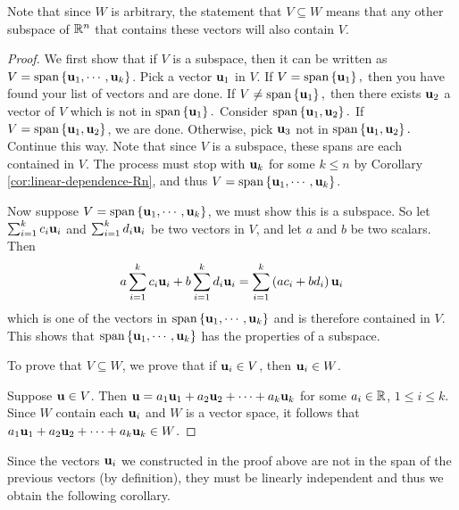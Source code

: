 Note that since $W$ is arbitrary, the statement that $V \subseteq W$ means that any other subspace of $\mathbb{R}^n$ that contains these vectors will also contain $V$. 

\begin{proof}
We first show that if $V$ is a subspace, then it can be written as $V= \mbox{\rm span}\left\{\mbox{\bf u}_{1},\cdots ,\mbox{\bf u}_{k}\right\}$. Pick a vector $\mbox{\bf u}_{1}$ in $V$. If $V=
\mbox{\rm span}\left\{\mbox{\bf u}_{1}\right\} ,$ then you have found your
list of vectors and are done. If $V\neq \mbox{\rm span}\left\{\mbox{\bf u}_{1}\right\} ,$ then
there exists $\mbox{\bf u}_{2}$ a vector of $V$ which is not in $
\mbox{\rm span}\left\{\mbox{\bf u}_{1}\right\} .$ Consider $\mbox{\rm span}\left\{
\mbox{\bf u}_{1},\mbox{\bf u}_{2}\right\}.$ 
If $V=\mbox{\rm span}\left\{\mbox{\bf u}_{1},\mbox{\bf u}_{2}\right\}$, we are
done. Otherwise, pick $\mbox{\bf u}_{3}$ not in $\mbox{\rm span}\left\{\mbox{\bf u}_{1},\mbox{\bf u}_{2}\right\} .$ Continue this way.
Note that since $V $ is a subspace, these spans are each contained in
$V$.  The process must stop with $\mbox{\bf u}_{k}$ for some $k\leq n$
by Corollary \ref{cor:linear-dependence-Rn}, and thus $V=\mbox{\rm span}\left\{\mbox{\bf u}_{1},\cdots ,
\mbox{\bf u}_{k}\right\}$.

Now suppose $V=\mbox{\rm span}\left\{\mbox{\bf u}_{1},\cdots ,
\mbox{\bf u}_{k}\right\}$, we must show this is a subspace. So let $\sum_{i=1}^{k}c_{i}\mbox{\bf u}_{i}$ and $
\sum_{i=1}^{k}d_{i}\mbox{\bf u}_{i}$ be two vectors in $V$, and let $a$
and $b$ be two scalars. Then 
\begin{equation*}
a \sum_{i=1}^{k}c_{i}\mbox{\bf u}_{i}+ b \sum_{i=1}^{k}d_{i}\mbox{\bf u}_{i}=
 \sum_{i=1}^{k}\left(a c_{i}+b  d_{i}\right) \mbox{\bf u}_{i}
\end{equation*}
which is one of the vectors in $\mbox{\rm span}\left\{\mbox{\bf u}_{1},\cdots ,
\mbox{\bf u}_{k}\right\}$ and is therefore contained in $V$. This shows that $\mbox{\rm span}\left\{\mbox{\bf u}_{1},\cdots ,\mbox{\bf u}_{k}\right\} $ has the properties of a subspace. 

To prove that $V \subseteq W$, we prove that if
$\mbox{\bf u}_i\in V$, then $\mbox{\bf u}_i \in W$.

Suppose $\mbox{\bf u}\in V$. 
Then $\mbox{\bf u}=a_1\mbox{\bf u}_1 + a_2\mbox{\bf u}_2 + \cdots + a_k\mbox{\bf u}_k$
for some $a_i\in\mathbb{R}$, $1\leq i\leq k$.
Since $W$ contain each $\mbox{\bf u}_i$ and $W$ is a vector space, it follows that $ a_1\mbox{\bf u}_1 + a_2\mbox{\bf u}_2 + \cdots + a_k\mbox{\bf u}_k \in W$. 
\end{proof}

Since the vectors $\mbox{\bf u}_i$ we constructed in the proof above are not in the span
of the previous vectors (by definition), they must be linearly independent and thus we
obtain the following corollary.

